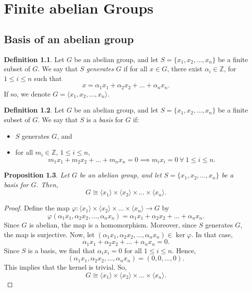\documentclass[a4paper, openany]{memoir}
\theoremstyle{definition}
\newtheorem{definition}{Definition}[section]
\theoremstyle{plain}
\newtheorem{proposition}[definition]{Proposition}
\begin{document}
    \chapter{Finite abelian Groups}
    \section{Basis of an abelian group}
    \begin{definition}
        Let $G$ be an abelian group, and let $S = \{x_1, x_2, \dots, x_n\}$ be a finite subset of $G$. We say that $S$ \emph{generates} $G$ if for all $x \in G$, there exist $\alpha_i \in \mathbb{Z}$, for $1 \leq i \leq n$ such that
        \[x = \alpha_1 x_1 + \alpha_2 x_2 + \dots + \alpha_n x_n.\]
        If so, we denote $G = \langle x_1, x_2, \dots, x_n \rangle$.
    \end{definition}

    \begin{definition}
        Let $G$ be an abelian group, and let $S = \{x_1, x_2, \dots, x_n\}$ be a finite subset of $G$. We say that $S$ is a \emph{basis} for $G$ if:
        \begin{itemize}
            \item $S$ generates $G$, and
            \item for all $m_i \in \mathbb{Z}$, $1 \leq i \leq n$,
            \[m_1 x_1 + m_2 x_2 + \dots + m_n x_n = 0 \implies m_i x_i = 0 \ \forall \ 1 \leq i \leq n.\]
        \end{itemize}
    \end{definition}

    \begin{proposition}
        Let $G$ be an abelian group, and let $S = \{x_1, x_2, \dots, x_n\}$ be a basis for $G$. Then,
        \[G \cong \langle x_1 \rangle \times \langle x_2 \rangle \times \dots \times \langle x_n \rangle.\]
    \end{proposition}
    \begin{proof}
        Define the map $\varphi \colon \langle x_1 \rangle \times \langle x_2 \rangle \times \dots \times \langle x_n \rangle \to G$ by
        \[\varphi(\alpha_1 x_1, \alpha_2 x_2, \dots, \alpha_n x_n) = \alpha_1 x_1 + \alpha_2 x_2 + \dots + \alpha_n x_n.\]
        Since $G$ is abelian, the map is a homomorphism. Moreover, since $S$ generates $G$, the map is surjective. Now, let $(\alpha_1 x_1, \alpha_2 x_2, \dots, \alpha_n x_n) \in \ker \varphi$. In that case,
        \[\alpha_1 x_1 + \alpha_2 x_2 + \dots + \alpha_n x_n = 0.\]
        Since $S$ is a basis, we find that $\alpha_i x_i = 0$ for all $1 \leq i \leq n$. Hence, 
        \[(\alpha_1 x_1, \alpha_2 x_2, \dots, \alpha_n x_n) = (0, 0, \dots, 0).\]
        This implies that the kernel is trivial. So, 
        \[G \cong \langle x_1 \rangle \times \langle x_2 \rangle \times \dots \times \langle x_n \rangle.\]
    \end{proof}
\end{document}
